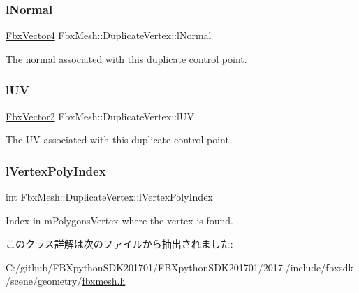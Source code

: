 \subsubsection{\texorpdfstring{l\+Normal}{lNormal}}
{\footnotesize\ttfamily \hyperlink{class_fbx_vector4}{Fbx\+Vector4} Fbx\+Mesh\+::\+Duplicate\+Vertex\+::l\+Normal}



The normal associated with this duplicate control point. 

\mbox{\label{class_fbx_mesh_1_1_duplicate_vertex_a8788aaa86c459f069d1f90bd27acbee0}} 
\subsubsection{\texorpdfstring{l\+UV}{lUV}}
{\footnotesize\ttfamily \hyperlink{class_fbx_vector2}{Fbx\+Vector2} Fbx\+Mesh\+::\+Duplicate\+Vertex\+::l\+UV}



The UV associated with this duplicate control point. 

\mbox{\label{class_fbx_mesh_1_1_duplicate_vertex_afe223b4087156f6779fc5883dc56332c}} 
\subsubsection{\texorpdfstring{l\+Vertex\+Poly\+Index}{lVertexPolyIndex}}
{\footnotesize\ttfamily int Fbx\+Mesh\+::\+Duplicate\+Vertex\+::l\+Vertex\+Poly\+Index}



Index in m\+Polygons\+Vertex where the vertex is found. 



このクラス詳解は次のファイルから抽出されました\+:\begin{DoxyCompactItemize}
\item 
C\+:/github/\+F\+B\+Xpython\+S\+D\+K201701/\+F\+B\+Xpython\+S\+D\+K201701/2017./include/fbxsdk/scene/geometry/\hyperlink{fbxmesh_8h}{fbxmesh.\+h}\end{DoxyCompactItemize}
